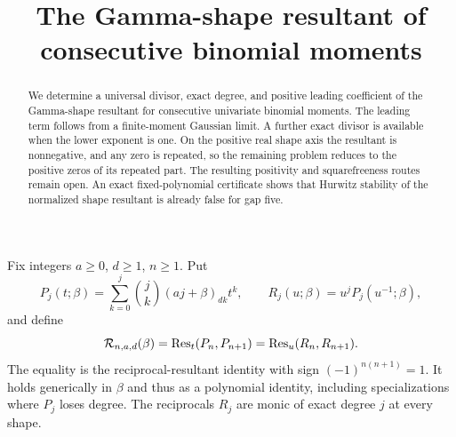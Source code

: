 \documentclass[11pt]{article}
\newcommand{\Res}{\operatorname{Res}}
\begin{document}
\setlength{\emergencystretch}{1em}
\title{The Gamma-shape resultant of consecutive binomial moments}
\author{}\date{}\maketitle
\begin{abstract}
We determine a universal divisor, exact degree, and positive leading
coefficient of the Gamma-shape resultant for consecutive univariate
binomial moments. The leading term follows from a finite-moment
Gaussian limit. A further exact divisor is available when the lower
exponent is one. On the positive real shape axis the resultant is
nonnegative, and any zero is repeated, so the remaining problem reduces
to the positive zeros of its repeated part. The resulting positivity
and squarefreeness routes remain open. An exact fixed-polynomial
certificate shows that Hurwitz stability of the normalized shape
resultant is already false for gap five.
\end{abstract}
Fix integers $a\ge0$, $d\ge1$, $n\ge1$. Put
\[
 P_j(t;\beta)=\sum_{k=0}^j\binom jk(aj+\beta)_{dk}t^k,
 \qquad R_j(u;\beta)=u^jP_j(u^{-1};\beta),
\]
and define
\[
 {\cal R}_{n,a,d}(\beta)=\Res_t(P_n,P_{n+1})
                       =\Res_u(R_n,R_{n+1}).
\]
The equality is the reciprocal-resultant identity with sign
$(-1)^{n(n+1)}=1$. It holds generically in $\beta$ and thus as a
polynomial identity, including specializations where $P_j$ loses degree.
The reciprocals $R_j$ are monic of exact degree $j$ at every shape.
\end{document}
